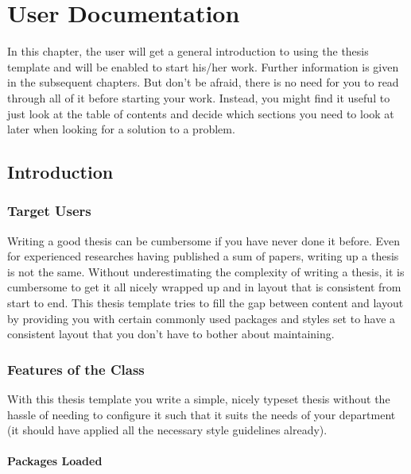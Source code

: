 \lstset{language=[LaTeX]TeX}

\chapter{User Documentation}

\begin{intro}
In this chapter, the user will get a general introduction to using the thesis template and will be enabled to start his/her work.
Further information is given in the subsequent chapters.
But don't be afraid, there is no need for you to read through all of it before starting your work.
Instead, you might find it useful to just look at the table of contents and decide which sections you need to look at later when looking for a solution to a problem.
\end{intro}


\section{Introduction}\label{sec:user-documentation:introduction}

\subsection{Target Users}\label{sec:user-documentation:target-users}

Writing a good thesis can be cumbersome if you have never done it before.
Even for experienced researches having published a sum of papers, writing up a thesis is not the same.
Without underestimating the complexity of writing a thesis, it is cumbersome to get it all nicely wrapped up and in layout that is consistent from start to end.
This thesis template tries to fill the gap between content and layout by providing you with certain commonly used packages and styles set to have a consistent layout that you don't have to bother about maintaining.


\subsection{Features of the Class}\label{sec:user-documentation:features}

With this thesis template you write a simple, nicely typeset thesis without the hassle of needing to configure it such that it suits the needs of your department (it should have applied all the necessary style guidelines already).


\subsubsection{Packages Loaded}

